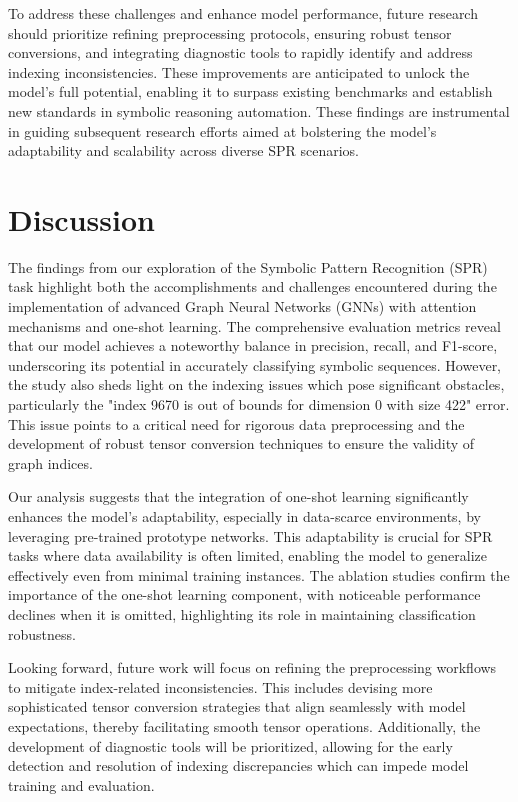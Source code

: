 \documentclass{article}
\begin{document}
To address these challenges and enhance model performance, future research should prioritize refining preprocessing protocols, ensuring robust tensor conversions, and integrating diagnostic tools to rapidly identify and address indexing inconsistencies. These improvements are anticipated to unlock the model's full potential, enabling it to surpass existing benchmarks and establish new standards in symbolic reasoning automation. These findings are instrumental in guiding subsequent research efforts aimed at bolstering the model's adaptability and scalability across diverse SPR scenarios.

\section{Discussion}
The findings from our exploration of the Symbolic Pattern Recognition (SPR) task highlight both the accomplishments and challenges encountered during the implementation of advanced Graph Neural Networks (GNNs) with attention mechanisms and one-shot learning. The comprehensive evaluation metrics reveal that our model achieves a noteworthy balance in precision, recall, and F1-score, underscoring its potential in accurately classifying symbolic sequences. However, the study also sheds light on the indexing issues which pose significant obstacles, particularly the "index 9670 is out of bounds for dimension 0 with size 422" error. This issue points to a critical need for rigorous data preprocessing and the development of robust tensor conversion techniques to ensure the validity of graph indices.

Our analysis suggests that the integration of one-shot learning significantly enhances the model's adaptability, especially in data-scarce environments, by leveraging pre-trained prototype networks. This adaptability is crucial for SPR tasks where data availability is often limited, enabling the model to generalize effectively even from minimal training instances. The ablation studies confirm the importance of the one-shot learning component, with noticeable performance declines when it is omitted, highlighting its role in maintaining classification robustness.

Looking forward, future work will focus on refining the preprocessing workflows to mitigate index-related inconsistencies. This includes devising more sophisticated tensor conversion strategies that align seamlessly with model expectations, thereby facilitating smooth tensor operations. Additionally, the development of diagnostic tools will be prioritized, allowing for the early detection and resolution of indexing discrepancies which can impede model training and evaluation.
\end{document}
